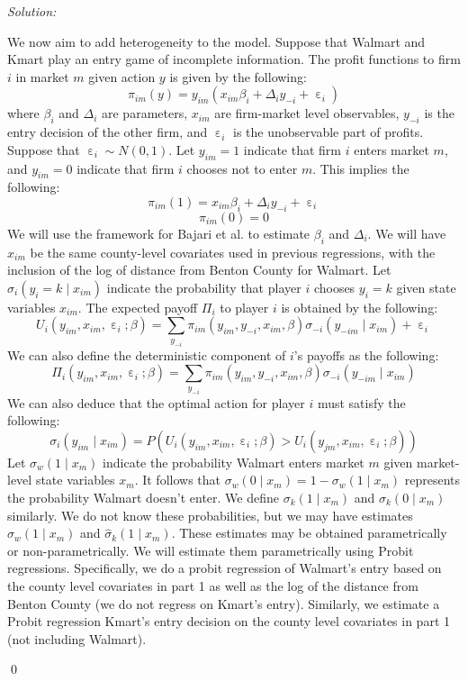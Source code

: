 \documentclass[12pt]{article}
\DeclareMathOperator{\eps}{\varepsilon}
\newenvironment{problem}[2][Problem]{\begin{trivlist}
\item[\hskip \labelsep {\bfseries #1}\hskip \labelsep {\bfseries #2.}]}{\end{trivlist}}
\newenvironment{sol}
    {\emph{Solution:}
    }
    {
    \qed
    }
\begin{document}
\begin{problem}{4}
\end{problem}
\begin{sol}
  We now aim to add heterogeneity to the model. Suppose that Walmart and Kmart play an entry game of incomplete information. The profit functions to firm $i$ in market $m$ given action $y$ is given by the following:
  \[\pi_{im}(y) = y_{im}(x_{im} \beta_i + \Delta_i y_{-i} + \eps_i)\]
  where $\beta_i$ and $\Delta_i$ are parameters, $x_{im}$ are firm-market level observables, $y_{-i}$ is the entry decision of the other firm, and $\eps_i$ is the unobservable part of profits. Suppose that $\eps_i \sim N(0,1)$. Let $y_{im}=1$ indicate that firm $i$ enters market $m$, and $y_{im} = 0 $ indicate that firm $i$ chooses not to enter $m$. This implies the following:
  \[\pi_{im}(1) = x_{im} \beta_i + \Delta_i y_{-i} + \eps_i\]
  \[\pi_{im}(0) = 0\]
  We will use the framework for Bajari et al. to estimate $\beta_i$ and $\Delta_i$. We will have $x_{im}$ be the same county-level covariates used in previous regressions, with the inclusion of the log of distance from Benton County for Walmart. Let $\sigma_i(y_i = k \mid x_{im})$ indicate the probability that player $i$ chooses $y_i = k$ given state variables $x_{im}$. The expected payoff $\Pi_i$ to player $i$ is obtained by the following:
  \[U_{i}(y_{im}, x_{im}, \eps_i; \beta) = \sum_{y_{-i}} \pi_{im}(y_{im}, y_{-i}, x_{im}, \beta) \sigma_{-i}(y_{-im}\mid x_{im}) + \eps_i \]
  We can also define the deterministic component of $i$'s payoffs as the following:
  \[\Pi_{i}(y_{im}, x_{im}, \eps_i; \beta) = \sum_{y_{-i}} \pi_{im}(y_{im}, y_{-i}, x_{im}, \beta) \sigma_{-i}(y_{-im}\mid x_{im}) \]
  We can also deduce that the optimal action for player $i$ must satisfy the following:
  \[\sigma_{i}(y_{im} \mid x_{im}) = P(U_{i}(y_{im}, x_{im}, \eps_i; \beta) > U_{i}(y_{jm}, x_{im}, \eps_i;\beta))\]
  Let $\sigma_{w}(1 \mid x_{m})$ indicate the probability Walmart enters market $m$ given market-level state variables $x_m$. It follows that $\sigma_{w}(0\mid x_m) = 1 - \sigma_{w}(1 \mid x_{m})$ represents the probability Walmart doesn't enter. We define $\sigma_{k}(1 \mid x_m)$ and $\sigma_k(0 \mid x_m)$ similarly. We do not know these probabilities, but we may have estimates $\hat{\sigma}_w(1\mid x_m)$ and $\hat{\sigma}_k(1 \mid x_m)$. These estimates may be obtained parametrically or non-parametrically. We will estimate them parametrically using Probit regressions. Specifically, we do a probit regression of Walmart's entry based on the county level covariates in part 1 as well as the log of the distance from Benton County (we do not regress on Kmart's entry). Similarly, we estimate a Probit regression Kmart's entry decision on the county level covariates in part 1 (not including Walmart). 
  

\end{sol}
\end{document}
